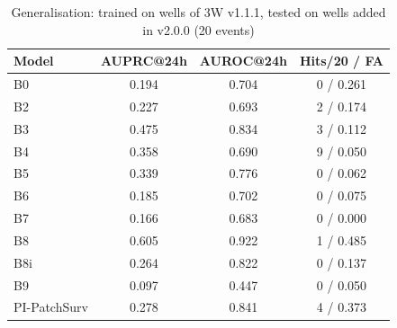 \begin{table}[t]
\caption{Generalisation: trained on wells of 3W v1.1.1, tested on wells added in v2.0.0 (20 events)}\label{tab:v1v2}
\scriptsize
\begin{tabular}{lccc}
\toprule
Model & AUPRC@24h & AUROC@24h & Hits/20 / FA \\
\midrule
B0 & 0.194 & 0.704 & 0 / 0.261 \\
B2 & 0.227 & 0.693 & 2 / 0.174 \\
B3 & 0.475 & 0.834 & 3 / 0.112 \\
B4 & 0.358 & 0.690 & 9 / 0.050 \\
B5 & 0.339 & 0.776 & 0 / 0.062 \\
B6 & 0.185 & 0.702 & 0 / 0.075 \\
B7 & 0.166 & 0.683 & 0 / 0.000 \\
B8 & 0.605 & 0.922 & 1 / 0.485 \\
B8i & 0.264 & 0.822 & 0 / 0.137 \\
B9 & 0.097 & 0.447 & 0 / 0.050 \\
PI-PatchSurv & 0.278 & 0.841 & 4 / 0.373 \\
\bottomrule
\end{tabular}
\end{table}
